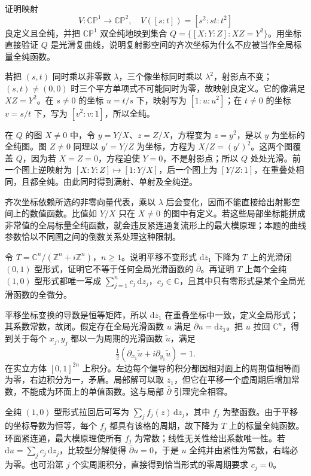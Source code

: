 \begin{optionalexercise}[射影二次曲线]\label{b3:ex:29-7}
证明映射
\[
 V:\mathbb{CP}^1\longrightarrow\mathbb{CP}^2,\quad
 V([s:t])=[s^2:st:t^2]
\]
良定义且全纯，并把 \(\mathbb{CP}^1\) 双全纯地映到集合
\(Q=\{[X:Y:Z]:XZ=Y^2\}\)。用坐标直接验证 \(Q\) 是光滑复曲线，说明复射影空间的齐次坐标为什么不应被当作全局标量全纯函数。
\end{optionalexercise}
\begin{solution}
若把 \((s,t)\) 同时乘以非零数 \(\lambda\)，三个像坐标同时乘以 \(\lambda^2\)，射影点不变；\((s,t)\ne(0,0)\) 时三个平方单项式不可能同时为零，故映射良定义。它的像满足 \(XZ=Y^2\)。在 \(s\ne0\) 的坐标 \(u=t/s\) 下，映射写为 \([1:u:u^2]\)；在 \(t\ne0\) 的坐标 \(v=s/t\) 下，写为 \([v^2:v:1]\)，所以全纯。

在 \(Q\) 的图 \(X\ne0\) 中，令 \(y=Y/X\)、\(z=Z/X\)，方程变为 \(z=y^2\)，是以 \(y\) 为坐标的全纯图。图 \(Z\ne0\) 同理以 \(y'=Y/Z\) 为坐标，方程为 \(X/Z=(y')^2\)。这两个图覆盖 \(Q\)，因为若 \(X=Z=0\)，方程迫使 \(Y=0\)，不是射影点；所以 \(Q\) 处处光滑。前一个图上逆映射为 \([X:Y:Z]\mapsto[1:Y/X]\)，后一个图上为 \([Y/Z:1]\)，在重叠处相同，且都全纯。由此同时得到满射、单射及全纯逆。

齐次坐标依赖所选的非零向量代表，乘以 \(\lambda\) 后会变化，因而不能直接给出射影空间上的数值函数。比值如 \(Y/X\) 只在 \(X\ne0\) 的图中有定义。若这些局部坐标能拼成非常值的全局标量全纯函数，就会违反紧连通复流形上的最大模原理；本题的曲线参数恰以不同图之间的倒数关系处理这种限制。
\end{solution}

\begin{optionalexercise}[复环面的全局障碍]\label{b3:ex:29-8}
令 \(T=\mathbb C^n/(\mathbb Z^n+i\mathbb Z^n)\)，\(n\ge1\)。说明平移不变形式 \(\mathrm d\overline z_1\) 下降为 \(T\) 上的光滑闭 \((0,1)\) 型形式，证明它不等于任何全局光滑函数的 \(\bar\partial\)。再证明 \(T\) 上每个全纯 \((1,0)\) 型形式都唯一写成 \(\sum_{j=1}^n c_j\,\mathrm dz_j\)，\(c_j\in\mathbb C\)，且其中只有零形式是某个全局光滑函数的全微分。
\end{optionalexercise}
\begin{solution}
平移坐标变换的导数是恒等矩阵，所以 \(\mathrm d\overline z_1\) 在重叠坐标中一致，定义全局形式；其系数常数，故闭。假定存在全局光滑函数 \(u\) 满足 \(\bar\partial u=\mathrm d\overline z_1\)。把 \(u\) 拉回 \(\mathbb C^n\)，得到关于每个 \(x_j,y_j\) 都以一为周期的光滑函数 \(\widetilde u\)，满足
\[
 \tfrac12\left(\partial_{x_1}\widetilde u
             +i\partial_{y_1}\widetilde u\right)=1.
\]
在实立方体 \([0,1]^{2n}\) 上积分。左边每个偏导的积分都因相对面上的周期值相等而为零，右边积分为一，矛盾。局部解可以取 \(\overline z_1\)，但它在平移一个虚周期后增加常数，不能成为环面上的单值函数。这与局部 \(\bar\partial\) 引理完全相容。

全纯 \((1,0)\) 型形式拉回后可写为 \(\sum_j f_j(z)\,\mathrm dz_j\)，其中 \(f_j\) 为整函数。由于平移的坐标导数为恒等，每个 \(f_j\) 都具有该格的周期，故下降为 \(T\) 上的标量全纯函数。环面紧连通，最大模原理使所有 \(f_j\) 为常数；线性无关性给出系数唯一性。若 \(\mathrm du=\sum_jc_j\,\mathrm dz_j\)，比较型分解便得 \(\bar\partial u=0\)，于是 \(u\) 全纯并由紧性为常数，右端必为零。也可沿第 \(j\) 个实周期积分，直接得到恰当形式的零周期要求 \(c_j=0\)。
\end{solution}
